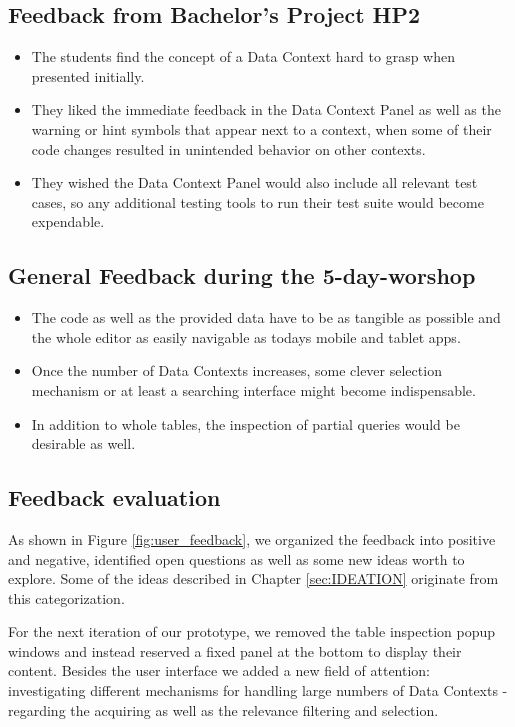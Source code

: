 \subsection{Feedback from Bachelor's Project HP2}
\label{subsec:FeedbackBPHP2}
\begin{itemize}
	\item The students find the concept of a Data Context hard to grasp when presented initially.

	\item They liked the immediate feedback in the Data Context Panel as well as the warning or hint symbols that appear next to a context, when some of their code changes resulted in unintended behavior on other contexts.

	\item They wished the Data Context Panel would also include all relevant test cases, so any additional testing tools to run their test suite would become expendable.
\end{itemize}


\subsection{General Feedback during the 5-day-worshop}
\label{subsec:FeedbackWeek}
\begin{itemize}
	\item The code as well as the provided data have to be as tangible as possible and the whole editor as easily navigable as todays mobile and tablet apps.

	\item Once the number of Data Contexts increases, some clever selection mechanism or at least a searching interface might become indispensable.

	\item In addition to whole tables, the inspection of partial queries would be desirable as well.
\end{itemize}

\subsection{Feedback evaluation}
\label{subsec:FeedbackEvaluation}
As shown in Figure \ref{fig:user_feedback}, we organized the feedback into positive and negative, identified open questions as well as some new ideas worth to explore. Some of the ideas described in Chapter \ref{sec:IDEATION} originate from this categorization.

For the next iteration of our prototype, we removed the table inspection popup windows and instead reserved a fixed panel at the bottom to display their content. Besides the user interface we added a new field of attention: investigating different mechanisms for handling large numbers of Data Contexts - regarding the acquiring as well as the relevance filtering and selection.

